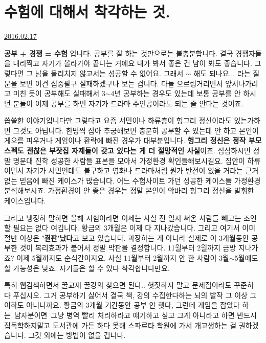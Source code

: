 \section{수험에 대해서 착각하는 것.}
\href{https://www.kockoc.com/Apoc/638785}{2016.02.17}

\vspace{5mm}

\textbf{공부 + 경쟁 = 수험} 입니다.
공부를 잘 하는 것만으로는 불충분합니다. 결국 경쟁자들을 내리찍고 자기가 올라가야 끝나는 거예요
내가 봐서 좋은 건 남이 봐도 좋습니다. 그렇다면 그 남을 물리치지 않고서는 성공할 수 없어요.
그래서 $\sim$ 해도 되나요... 라는 질문을 보면 이건 십중팔구 실패하겠구나 보는 겁니다.
다들 으르렁거리면서 앞서나가려고 미친 듯이 공부해도 실패해서 3$\sim$4년 공부하는 경우도 있는데
보통 공부를 안 하시던 분들이 이제 공부를 하면 자기가 드라마 주인공이라도 되는 줄 안다는 것이죠.
\vspace{5mm}

씁쓸한 이야기입니다만
그렇다고 요즘 서민이나 하류층이 헝그리 정신이라도 있는가하면 그것도 아닙니다.
한명씩 잡아 추궁해보면 충분히 공부할 수 있는데 안 하고 본인이 게으름 피우거나 게임이나 환락에 빠진 경우가 대부분입니다.
\textbf{헝그리 정신은 정작 부모 스펙도 괜찮은 부잣집 자제들이 갖고 있다는 게 더 절망적인 사실}이죠.
심심하시면 정말 명문대 진학 성공한 사람들 표본을 모아서 가정환경 확인들해보시길요.
집안이 하류이면서 자기가 서민인데도 불구하고 영화나 드라마처럼 뭔가 반전이 있을 거라는 근거없는 믿음에 빠진 케이스가 많습니다.
어느 수험사이트 가던 성공한 케이스들 가정환경 분석해보시죠.
가정환경이 안 좋은 경우는 정말 본인이 악바리 헝그리 정신을 발휘한 케이스입니다.
\vspace{5mm}

그리고 냉정히 말하면 올해 시험이라면 이제는 사실 전 일지 써온 사람들 빼고는 조언할 필요는 없다 여깁니다.
황금의 3개월은 이제 다 지나갔습니다. 그리고 여기서 이미 절반 이상은 \textbf{'결판'났다}고 보고 있습니다.
과장하는 게 아니라 실제로 이 3개월동안 공부한 것이 복리효과가 붙어서 정말 막판을 결정합니다.
11월부터 2월까지 금방 지나가죠? 이제 5월까지도 순식간이지요.
사실 11월부터 2월까지 안 한 사람이 3월$\sim$5월에도 할 가능성은 낮죠.
자기들은 할 수 있다 착각합니다만요.
\vspace{5mm}

특히 웹검색하면서 꿀교재 꿀강의 찾으면 된다..
헛짓하지 말고 문제집이라도 꾸준히 다 푸십시오. 그거 공부하기 싫어서 결국 책, 강의 수집한다하는 뇌의 발작 그 이상 그 이하도 아니니까요.
황금의 3개월 기간동안 공부 안 햇다, 그런데 게임을 잡았다 하는 남자분이면 그냥 병역 빨리 처리하라고 얘기하고 싶고
그게 아니라고 하면 반드시 집독학하지말고 도서관에 가든 하다 못해 스파르타 학원에 가서 개고생하는 걸 권하겠습니다.
그것 외에는 방법이 없을 겁니다.
\vspace{5mm}


